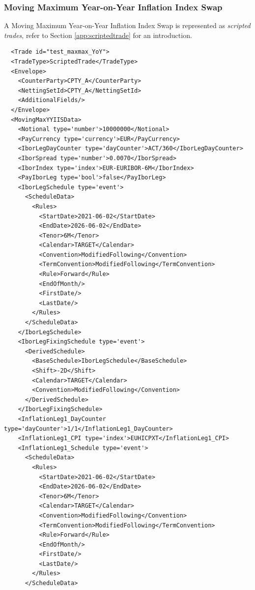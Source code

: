 \subsubsection{Moving Maximum Year-on-Year Inflation Index Swap}


A Moving Maximum Year-on-Year Inflation Index Swap is represented as {\em scripted trades}, refer to Section
\ref{app:scriptedtrade} for an introduction.

\begin{verbatim}
  <Trade id="test_maxmax_YoY">
  <TradeType>ScriptedTrade</TradeType>
  <Envelope>
    <CounterParty>CPTY_A</CounterParty>
    <NettingSetId>CPTY_A</NettingSetId>
    <AdditionalFields/>
  </Envelope>
  <MovingMaxYYIISData>
    <Notional type='number'>10000000</Notional>
    <PayCurrency type='currency'>EUR</PayCurrency>
    <IborLegDayCounter type='dayCounter'>ACT/360</IborLegDayCounter>
    <IborSpread type='number'>0.0070</IborSpread>
    <IborIndex type='index'>EUR-EURIBOR-6M</IborIndex>
    <PayIborLeg type='bool'>false</PayIborLeg>
    <IborLegSchedule type='event'>
      <ScheduleData>
        <Rules>
          <StartDate>2021-06-02</StartDate>
          <EndDate>2026-06-02</EndDate>
          <Tenor>6M</Tenor>
          <Calendar>TARGET</Calendar>
          <Convention>ModifiedFollowing</Convention>
          <TermConvention>ModifiedFollowing</TermConvention>
          <Rule>Forward</Rule>
          <EndOfMonth/>
          <FirstDate/>
          <LastDate/>
        </Rules>
      </ScheduleData>
    </IborLegSchedule>
    <IborLegFixingSchedule type='event'>
      <DerivedSchedule>
        <BaseSchedule>IborLegSchedule</BaseSchedule>
        <Shift>-2D</Shift>
        <Calendar>TARGET</Calendar>
        <Convention>ModifiedFollowing</Convention>
      </DerivedSchedule>
    </IborLegFixingSchedule>
    <InflationLeg1_DayCounter type='dayCounter'>1/1</InflationLeg1_DayCounter>
    <InflationLeg1_CPI type='index'>EUHICPXT</InflationLeg1_CPI>
    <InflationLeg1_Schedule type='event'>
      <ScheduleData>
        <Rules>
          <StartDate>2021-06-02</StartDate>
          <EndDate>2026-06-02</EndDate>
          <Tenor>6M</Tenor>
          <Calendar>TARGET</Calendar>
          <Convention>ModifiedFollowing</Convention>
          <TermConvention>ModifiedFollowing</TermConvention>
          <Rule>Forward</Rule>
          <EndOfMonth/>
          <FirstDate/>
          <LastDate/>
        </Rules>
      </ScheduleData>

\end{verbatim}
